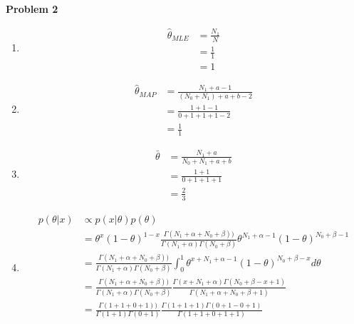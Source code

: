 \documentclass[11pt,letterpaper]{article}
\begin{document}
\noindent
\textbf{Problem 2}
\begin{enumerate}[labelindent=0pt]
\item 
	\begin{align*}
	\widehat{\theta}_{MLE} &= \frac{N_{1}}{N} \\
	&= \frac{1}{1}\\
	&=1
	\end{align*}

\item 
	\begin{align*}
		\widehat{\theta}_{MAP} &= \frac{N_{1}+a-1}{(N_{0}+N_{1})+a+b-2}\\
		&= \frac{1+1-1}{0+1+1+1-2}\\
		&= \frac{1}{1}
	\end{align*}
\item 
	\begin{align*}
		\bar{\theta} &= \frac{N_{1}+a}{N_{0}+N_{1}+a+b}\\
		&= \frac{1+1}{0+1+1+1}\\
		&=\frac{2}{3}
	\end{align*}
\item 
	\begin{align*}
	\iffalse
	p(\theta|x) &\propto p(x|\theta)p(\theta) \\
	& = \prod_{n}^{N}\theta^{x_{n}}(1-\theta)^{-x_{n}} \\
	&= \theta^{N_{1}}(1 - \theta) \\
	&= Beta(\theta| N_{1}+\alpha, N_{0}+\beta)\\
	&= \theta^{N_{1}+\alpha-1}(1-\theta)^{N_{0}+\beta-1}\\
	&=\\
		\\
	\fi
	p(\theta|x) &\propto p(x|\theta)p(\theta) \\
	&= \theta^{x}(1-\theta)^{1-x} \frac{\Gamma(N_{1}+\alpha + N_{0}+\beta))}{\Gamma(N_{1}+\alpha)\Gamma(N_{0}+\beta)} \theta^{N_{1}+\alpha - 1}(1-\theta)^{N_{0}+\beta-1} \\
	&= \frac{\Gamma(N_{1}+\alpha + N_{0}+\beta))}{\Gamma(N_{1}+\alpha)\Gamma(N_{0}+\beta)} \int_{0}^{1}\theta^{x + N_{1}+\alpha - 1}(1-\theta)^{N_{0}+\beta-x}d\theta \\
	&= \frac{\Gamma(N_{1}+\alpha + N_{0}+\beta))}{\Gamma(N_{1}+\alpha)\Gamma(N_{0}+\beta)} \frac{\Gamma(x+N_{1}+\alpha)\Gamma(N_{0}+\beta - x +1)}{\Gamma(N_{1}+\alpha+N_{0}+\beta+1)} \\
	&= \frac{\Gamma(1+1+ 0+1))}{\Gamma(1+1)\Gamma(0+1)} \frac{\Gamma(1+1+1)\Gamma(0+1- 0 +1)}{\Gamma(1+1+0+1+1)} \\

\end{align*}
\end{enumerate}
\end{document}
